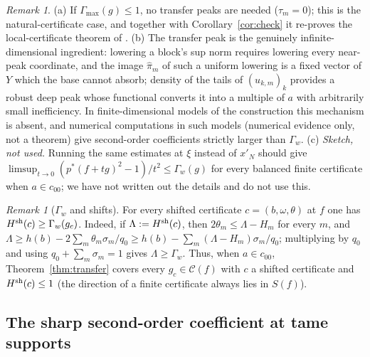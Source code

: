 \documentclass[10pt]{amsart}
\theoremstyle{definition}
\theoremstyle{remark}
\newtheorem{remark}[theorem]{Remark}
\newcommand{\Cset}{\mathcal C}
\begin{document}
\begin{remark}\label{rem:transfer}
(a) If $\Gamma_{\max}(g)\le1$, no transfer peaks are needed ($\tau_m=0$);
this is the natural-certificate case, and together with
Corollary~\ref{cor:check} it re-proves the local-certificate theorem of
\cite{Check}.  (b) The transfer peak is the genuinely infinite-dimensional
ingredient: lowering a block's sup norm requires lowering every near-peak
coordinate, and the image $\hat\pi_m$ of such a uniform lowering is a fixed
vector of $Y$ which the base cannot absorb; density of the tails of
$(u_{k,m})_k$ provides a robust deep peak whose functional converts it into
a multiple of $a$ with arbitrarily small inefficiency.  In finite-dimensional
models of the construction this mechanism is absent, and numerical
computations in such models (numerical evidence only, not a theorem) give
second-order coefficients strictly larger than $\Gamma_w$.
(c) \emph{Sketch, not used.}  Running the same estimates at $\xi$ instead
of $x'_N$ should give
$\limsup_{t\to0}(p^*(f+tg)^2-1)/t^2\le\Gamma_w(g)$ for every balanced finite
certificate when $a\in c_{00}$; we have not written out the details and do
not use this.
\end{remark}

\begin{remark}[$\Gamma_w$ and shifts]\label{rem:gammaw}
For every shifted certificate $c=(b,\omega,\theta)$ at $f$ one has
$H^{\rm sh}(c)\ge\Gamma_w(g_c)$.  Indeed, if $\Lambda:=H^{\rm sh}(c)$, then
$2\theta_m\le\Lambda-H_m$ for every $m$, and
$\Lambda\ge h(b)-2\sum_m\theta_m\sigma_m/q_0\ge h(b)-\sum_m(\Lambda-H_m)
\sigma_m/q_0$; multiplying by $q_0$ and using $q_0+\sum_m\sigma_m=1$ gives
$\Lambda\ge\Gamma_w$.  Thus, when $a\in c_{00}$, Theorem~\ref{thm:transfer}
covers every $g_c\in\Cset(f)$ with $c$ a shifted certificate and
$H^{\rm sh}(c)\le1$ (the direction of a finite certificate always lies in
$S(f)$).
\end{remark}

\subsection{The sharp second-order coefficient at tame supports}
\end{document}
